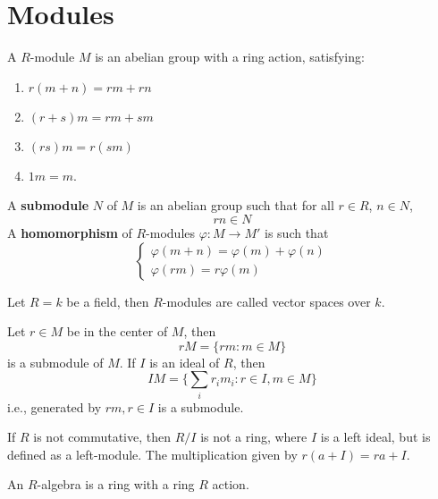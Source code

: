 \documentclass[openany]{book}
\begin{document}
\section{Modules}
\begin{defn}[module]
    A $R$-module $M$ is an abelian group with a ring action, satisfying:
    \begin{enumerate}
        \item $r(m+n)=rm+rn$
        \item $(r+s)m=rm+sm$
        \item $(rs)m=r(sm)$
        \item $1m=m$.
    \end{enumerate}
    A \textbf{submodule} $N$ of $M$ is an abelian group such that for all $r\in R$, $n\in N$,
    \begin{equation*}
        rn\in N
    \end{equation*}
    A \textbf{homomorphism} of $R$-modules $\varphi: M\to M'$ is such that 
    \begin{equation*}
        \begin{cases}
            \varphi(m+n)=\varphi(m)+\varphi(n)\\
            \varphi(rm)=r\varphi(m)
        \end{cases}
    \end{equation*}
\end{defn}
Let $R=k$ be a field, then $R$-modules are called vector spaces over $k$.

\begin{defn}
    Let $r\in M$ be in the center of $M$, then 
    \begin{equation*}
        rM=\{rm: m\in M\}
    \end{equation*}
    is a submodule of $M$. If $I$ is an ideal of $R$, then 
    \begin{equation*}
        IM=\{\sum_ir_im_i: r\in I, m\in M\}
    \end{equation*}
    i.e., generated by $rm, r\in I$ is a submodule.
\end{defn}

\begin{example}
    If $R$ is not commutative, then $R/I$ is not a ring, where $I$ is a left ideal, but is defined as a left-module. The multiplication given by $r(a+I)=ra+I$.
\end{example}





\begin{defn}
    An $R$-algebra is a ring with a ring $R$ action.
\end{defn}
\end{document}
